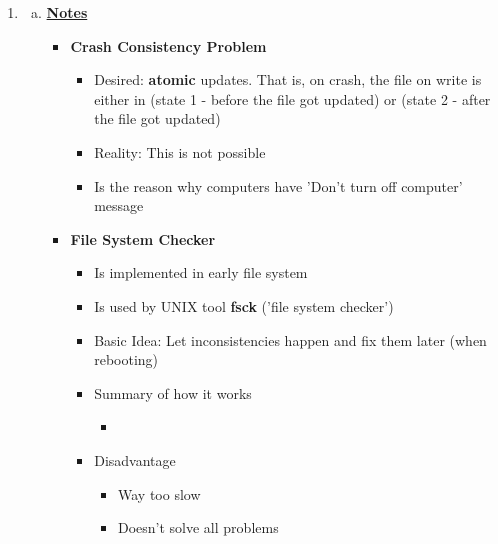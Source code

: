 \documentclass[12pt]{article}
\begin{document}
\begin{enumerate}[1.]
    \item

    \begin{enumerate}[a)]
        \item

        \bigskip

        \underline{\textbf{Notes}}

        \begin{itemize}
            \item \textbf{Crash Consistency Problem}

            \begin{itemize}
                \item Desired: \textbf{atomic} updates. That is, on crash,
                the file on write is either in (state 1 - before the file got updated)
                or (state 2 - after the file got updated)
                \item Reality: This is not possible
                \item Is the reason why computers have 'Don't turn off computer' message
            \end{itemize}

            \item \textbf{File System Checker}

            \begin{itemize}
                \item Is implemented in early file system
                \item Is used by UNIX tool \textbf{fsck} ('file system checker')
                \item Basic Idea: Let inconsistencies happen and fix them later (when rebooting)
                \item Summary of how it works

                \begin{itemize}
                    \item
                \end{itemize}

                \item Disadvantage
                \begin{itemize}
                    \item Way too slow
                    \item Doesn't solve all problems
                \end{itemize}
            \end{itemize}
        \end{itemize}

    \end{enumerate}

\end{enumerate}
\end{document}
